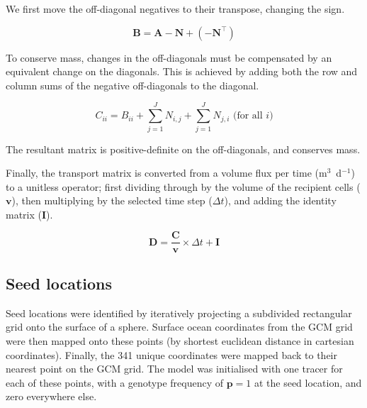 \documentclass[12pt]{article}
\begin{document}
We first move the off-diagonal negatives to their transpose, changing the sign.

\begin{equation}
\mathbf{B} = \mathbf{A} - \mathbf{N} + ( - \mathbf{N}^\top)
\end{equation}

To conserve mass, changes in the off-diagonals must be compensated by an equivalent change on the diagonals. This is achieved by adding both the row and column sums of the negative off-diagonals to the diagonal. 

\begin{equation}
C_{i i} = B_{i i} + \sum_{j=1}^J N_{i,j} + \sum_{j=1}^J N_{j,i} \text{ (for all $i$)}
\end{equation}

The resultant matrix is positive-definite on the off-diagonals, and conserves mass.

Finally, the transport matrix is converted from a volume flux per time (m$^3$~d$^{-1}$) to a unitless operator; first dividing through by the volume of the recipient cells ($\mathbf{v}$), then multiplying by the selected time step ($\Delta t$), and adding the identity matrix ($\mathbf{I}$).

\begin{equation}
\mathbf{D} = \frac{\mathbf{C}}{\mathbf{v}} \times \Delta t + \mathbf{I}
\end{equation}

\subsection{Seed locations}

Seed locations were identified by iteratively projecting a subdivided rectangular grid onto the surface of a sphere. Surface ocean coordinates from the GCM grid were then mapped onto these points (by shortest euclidean distance in cartesian coordinates). Finally, the 341 unique coordinates were mapped back to their nearest point on the GCM grid. The model was initialised with one tracer for each of these points, with a genotype frequency of $\mathbf{p} = 1$ at the seed location, and zero everywhere else. 




\end{document}
